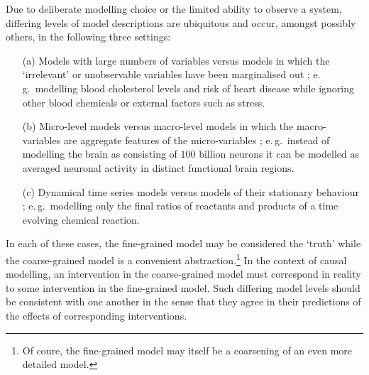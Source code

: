 Due to deliberate modelling choice or the limited ability to observe a system, differing levels of model descriptions are ubiquitous and occur, amongst possibly others, in the following three settings:

\begin{itemize}[noitemsep]
	\item[(a)] Models with large numbers of variables versus models in which the `irrelevant' or unobservable variables have been marginalised out \citep{bongers2016structural}; e.\,g.\ modelling blood cholesterol levels and risk of heart disease while ignoring other blood chemicals or external factors such as stress.
	
	\item[(b)] Micro-level models versus macro-level models in which the macro-variables are aggregate features of the micro-variables \citep{simon1961aggregation,iwasaki1994causality,hoel2013quantifying,chalupka2015visual,chalupka2016multi}; e.\,g.\ instead of modelling the brain as consisting of $100$ billion neurons it can be modelled as averaged neuronal activity in distinct functional brain regions.
	
	\item[(c)] Dynamical time series models versus models of their stationary behaviour \citep{fisher1970correspondence,iwasaki1994causality,dash2001caveats,lacerda2012discovering,mooij2013ode,mooij2013cyclic}; e.\,g.\ modelling only the final ratios of reactants and products of a time evolving chemical reaction.
\end{itemize}

In each of these cases, the fine-grained model may be considered the `truth' while the coarse-grained model is a convenient abstraction.\footnote{Of coure, the fine-grained model may itself be a coarsening of an even more detailed model.} 
In the context of causal modelling, an intervention in the coarse-grained model must correspond in reality to some intervention in the fine-grained model.
Such differing model levels should be consistent with one another in the sense that they agree in their predictions of the effects of corresponding interventions. 


